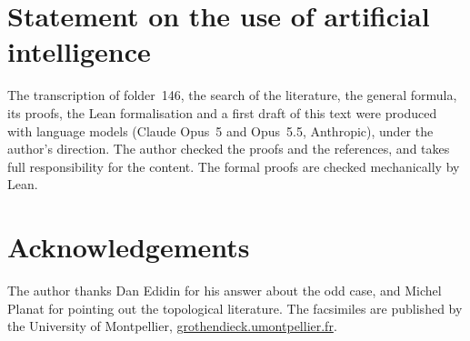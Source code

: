 \documentclass[11pt,a4paper]{amsart}
\theoremstyle{remark}
\begin{document}
\section*{Statement on the use of artificial intelligence}
The transcription of folder~146, the search of the literature, the general formula, its proofs, the Lean formalisation and a first draft of this text were produced with language models (Claude Opus~5 and Opus~5.5, Anthropic), under the author's direction. The author checked the proofs and the references, and takes full responsibility for the content. The formal proofs are checked mechanically by Lean.

\section*{Acknowledgements}
The author thanks Dan Edidin for his answer about the odd case, and Michel Planat for pointing out the topological literature. The facsimiles are published by the University of Montpellier, \href{https://grothendieck.umontpellier.fr/}{grothendieck.umontpellier.fr}.
\end{document}
